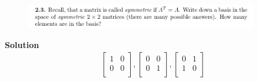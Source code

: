 \documentclass[cs4size,a4paper]{ctexart}
\numberwithin{equation}{section}
\numberwithin{table}{section}
\numberwithin{figure}{section}
\begin{document}
	\subsubsection{}
	\begin{figure}[H]
		\centering
		\includegraphics[width=0.9\textwidth]{1-2-3.png}
	\end{figure}
	\textbf{Solution}
	\begin{align}
		\left[\begin{matrix}
			1& 0\\
			0& 0\\
		\end{matrix}\right]
		,
		\left[\begin{matrix}
			0& 0\\
			0& 1\\
		\end{matrix}\right]
		,
		\left[\begin{matrix}
			0& 1\\
			1& 0\\
		\end{matrix}\right]
	\end{align}
\end{document}
